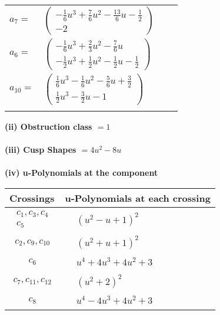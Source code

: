 \documentclass[1p]{elsarticle_modified}
\theoremstyle{definition}
\begin{document}
\begin{tabular}{m{7pt} m{180pt} m{7pt} m{180pt} }
\flushright $a_{7}=$&$\begin{pmatrix}-\frac{1}{6} u^3+\frac{7}{6} u^2-\frac{13}{6} u-\frac{1}{2}\\-2\end{pmatrix}$ \\
\flushright $a_{6}=$&$\begin{pmatrix}-\frac{1}{6} u^3+\frac{2}{3} u^2-\frac{7}{6} u\\-\frac{1}{2} u^3+\frac{1}{2} u^2-\frac{1}{2} u-\frac{1}{2}\end{pmatrix}$ \\
\flushright $a_{10}=$&$\begin{pmatrix}\frac{1}{6} u^3-\frac{1}{6} u^2-\frac{5}{6} u+\frac{3}{2}\\\frac{1}{2} u^3-\frac{3}{2} u-1\end{pmatrix}$\\&\end{tabular}
\flushleft \textbf{(ii) Obstruction class $= 1$}\\~\\
\flushleft \textbf{(iii) Cusp Shapes $= 4 u^2-8 u$}\\~\\
\newpage\renewcommand{\arraystretch}{1}
\flushleft \textbf{(iv) u-Polynomials at the component}\newline \\
\begin{tabular}{m{50pt}|m{274pt}}
Crossings & \hspace{64pt}u-Polynomials at each crossing \\
\hline $$\begin{aligned}c_{1},c_{3},c_{4}\\c_{5}\end{aligned}$$&$\begin{aligned}
&(u^2- u+1)^2
\end{aligned}$\\
\hline $$\begin{aligned}c_{2},c_{9},c_{10}\end{aligned}$$&$\begin{aligned}
&(u^2+u+1)^2
\end{aligned}$\\
\hline $$\begin{aligned}c_{6}\end{aligned}$$&$\begin{aligned}
&u^4+4 u^3+4 u^2+3
\end{aligned}$\\
\hline $$\begin{aligned}c_{7},c_{11},c_{12}\end{aligned}$$&$\begin{aligned}
&(u^2+2)^2
\end{aligned}$\\
\hline $$\begin{aligned}c_{8}\end{aligned}$$&$\begin{aligned}
&u^4-4 u^3+4 u^2+3
\end{aligned}$\\
\hline
\end{tabular}\\~\\
\end{document}
